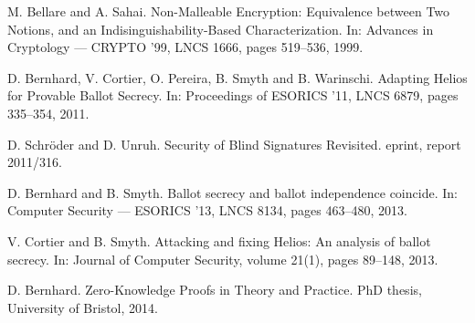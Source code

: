 \documentclass[envcountsame]{llncs}
\begin{document}
\begin{thebibliography}{XXX11}
M. Bellare and A. Sahai.
Non-Malleable Encryption: Equivalence between Two Notions, and an Indisinguishability-Based Characterization.
In: Advances in Cryptology --- CRYPTO '99, LNCS 1666, pages 519--536, 1999.

D. Bernhard, V. Cortier, O. Pereira, B. Smyth and B. Warinschi.
Adapting Helios for Provable Ballot Secrecy.
In: Proceedings of ESORICS '11, LNCS 6879, pages 335--354, 2011.

D. Schr\"oder and D. Unruh.
Security of Blind Signatures Revisited.
eprint, report 2011/316.

D. Bernhard and B. Smyth.
Ballot secrecy and ballot independence coincide.
In: Computer Security --- ESORICS '13, LNCS 8134, pages 463--480, 2013.

V. Cortier and B. Smyth.
Attacking and fixing Helios: An analysis of ballot secrecy.
In: Journal of Computer Security, volume 21(1), pages 89--148, 2013.

D. Bernhard.
Zero-Knowledge Proofs in Theory and Practice.
PhD thesis, University of Bristol, 2014.

\end{thebibliography}
\end{document}
